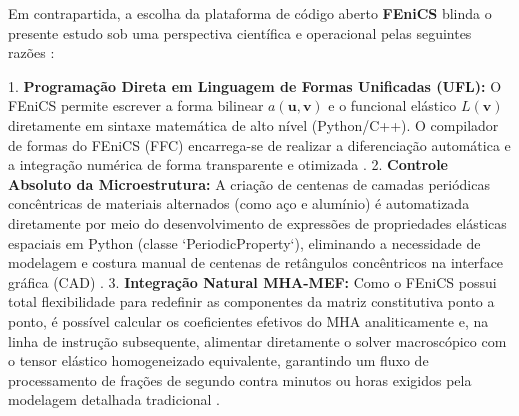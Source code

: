 Em contrapartida, a escolha da plataforma de código aberto \textbf{FEniCS} blinda o presente estudo sob uma perspectiva científica e operacional pelas seguintes razões \cite{logg2012automated}:

1. \textbf{Programação Direta em Linguagem de Formas Unificadas (UFL):} O FEniCS permite escrever a forma bilinear $a(\mathbf{u}, \mathbf{v})$ e o funcional elástico $L(\mathbf{v})$ diretamente em sintaxe matemática de alto nível (Python/C++). O compilador de formas do FEniCS (FFC) encarrega-se de realizar a diferenciação automática e a integração numérica de forma transparente e otimizada \cite{logg2012automated}.
2. \textbf{Controle Absoluto da Microestrutura:} A criação de centenas de camadas periódicas concêntricas de materiais alternados (como aço e alumínio) é automatizada diretamente por meio do desenvolvimento de expressões de propriedades elásticas espaciais em Python (classe `PeriodicProperty`), eliminando a necessidade de modelagem e costura manual de centenas de retângulos concêntricos na interface gráfica (CAD) \cite{logg2012automated}.
3. \textbf{Integração Natural MHA-MEF:} Como o FEniCS possui total flexibilidade para redefinir as componentes da matriz constitutiva ponto a ponto, é possível calcular os coeficientes efetivos do MHA analiticamente e, na linha de instrução subsequente, alimentar diretamente o solver macroscópico com o tensor elástico homogeneizado equivalente, garantindo um fluxo de processamento de frações de segundo contra minutos ou horas exigidos pela modelagem detalhada tradicional \cite{logg2012automated}.
